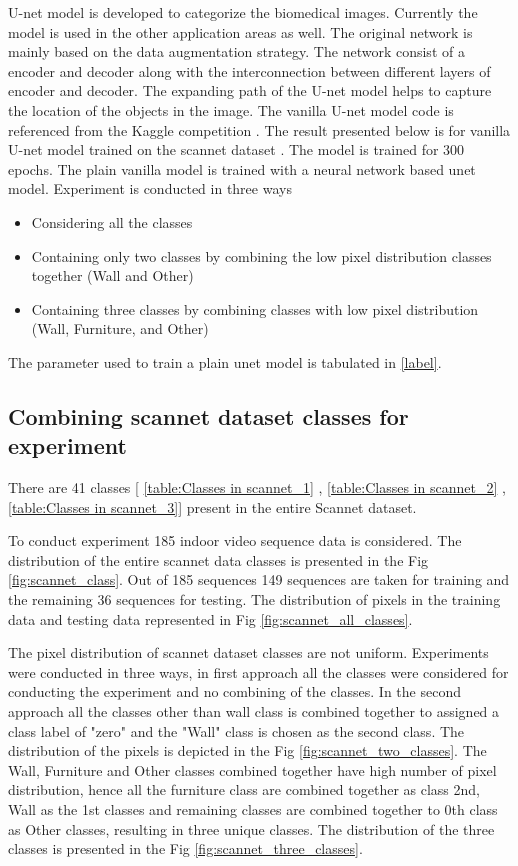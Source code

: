     U-net model is developed to categorize the biomedical images. Currently the model is used in the other application areas as well. The original network is mainly based on the data augmentation strategy. The network consist of a encoder and decoder along with the interconnection between different layers of encoder and decoder. The expanding path of the U-net model helps to capture the location of the objects in the image. The vanilla U-net model code is referenced from the Kaggle competition \cite{85_kag_challenge}. The result presented below is for vanilla U-net model trained on the scannet dataset \cite{79_dai2017scannet}. The model is trained for 300 epochs. The plain vanilla model is trained with a neural network based unet model. Experiment is conducted in three ways
    \begin{itemize}
    	\item Considering all the classes
    	\item Containing only two classes by combining the low pixel distribution classes together (Wall and Other)
    	\item Containing three classes by combining classes with low pixel distribution (Wall, Furniture, and Other)
    \end{itemize}
    
    
    The parameter used to train a plain unet model is tabulated in \ref{label}.
    
    \subsection{Combining scannet dataset classes for experiment}
    
	There are 41 classes [ \ref{table:Classes in scannet_1} , \ref{table:Classes in scannet_2} , \ref{table:Classes in scannet_3}] present in the entire Scannet dataset. 
    
    To conduct experiment 185 indoor video sequence data is considered. The distribution of the entire scannet data classes is presented in the Fig \ref{fig:scannet_class}. Out of 185 sequences 149 sequences are taken for training and the remaining 36 sequences for testing. The distribution of pixels in the training data and testing data represented in Fig \ref{fig:scannet_all_classes}.
    
    The pixel distribution of scannet dataset classes are not uniform. Experiments were conducted in three ways, in first approach all the classes were considered for conducting the experiment and no combining of the classes. In the second approach all the classes other than wall class is combined together to assigned a class label of "zero" and the "Wall" class is chosen as the second class. The distribution of the pixels is depicted in the Fig \ref{fig:scannet_two_classes}.
	The Wall, Furniture and Other classes combined together have high number of pixel distribution, hence all the furniture class are combined together as class 2nd, Wall as the 1st classes and remaining classes are combined together to 0th class as Other classes, resulting in three unique classes. The distribution of the three classes is presented in the Fig \ref{fig:scannet_three_classes}.
    

